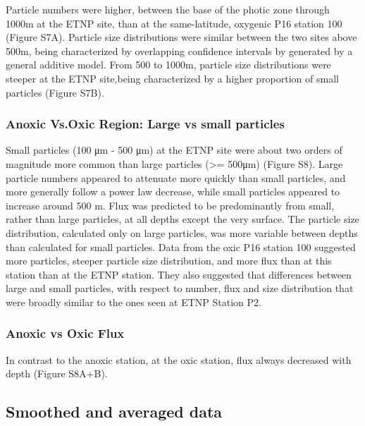 \documentclass[]{article}
\begin{document}
Particle numbers were higher, between the base of the photic zone
through 1000m at the ETNP site, than at the same-latitude, oxygenic P16
station 100 (Figure S7A). Particle size distributions were similar
between the two sites above 500m, being characterized by overlapping
confidence intervals by generated by a general additive model. From 500
to 1000m, particle size distributions were steeper at the ETNP
site,being characterized by a higher proportion of small particles
(Figure S7B).

\hypertarget{anoxic-vs.oxic-region-large-vs-small-particles}{%
\subsubsection{Anoxic Vs.Oxic Region: Large vs small
particles}\label{anoxic-vs.oxic-region-large-vs-small-particles}}

Small particles (100 μm - 500 μm) at the ETNP site were about two orders
of magnitude more common than large particles (\textgreater{}= 500μm)
(Figure S8). Large particle numbers appeared to attenuate more quickly
than small particles, and more generally follow a power law decrease,
while small particles appeared to increase around 500 m. Flux was
predicted to be predominantly from small, rather than large particles,
at all depths except the very surface. The particle size distribution,
calculated only on large particles, was more variable between depths
than calculated for small particles. Data from the oxic P16 station 100
suggested more particles, steeper particle size distribution, and more
flux than at this station than at the ETNP station. They also suggested
that differences between large and small particles, with respect to
number, flux and size distribution that were broadly similar to the ones
seen at ETNP Station P2.

\hypertarget{anoxic-vs-oxic-flux}{%
\subsubsection{Anoxic vs Oxic Flux}\label{anoxic-vs-oxic-flux}}

In contrast to the anoxic station, at the oxic station, flux always
decreased with depth (Figure S8A+B).

\hypertarget{smoothed-and-averaged-data}{%
\subsection{Smoothed and averaged
data}\label{smoothed-and-averaged-data}}
\end{document}
